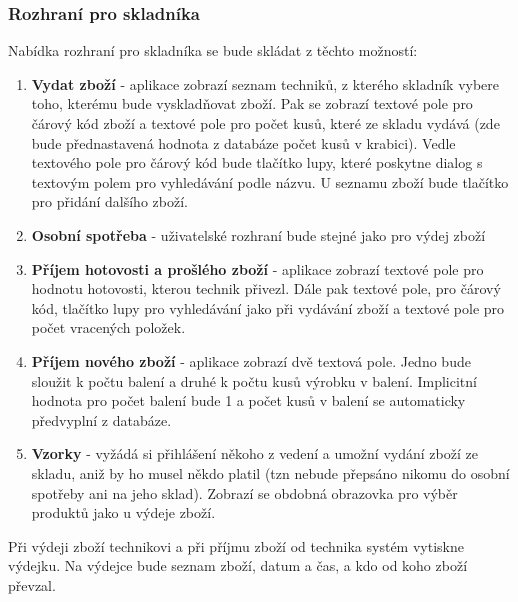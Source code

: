 \documentclass[a4paper,10pt]{article}
\begin{document}
\subsubsection{Rozhraní pro skladníka}
Nabídka rozhraní pro skladníka se bude skládat z těchto možností:
\begin{enumerate}
	\item \textbf{Vydat zboží} - aplikace zobrazí seznam techniků, z kterého skladník vybere toho, kterému bude vyskladňovat zboží. Pak se zobrazí textové pole pro čárový kód zboží a textové pole pro počet kusů, které ze skladu vydává (zde bude přednastavená hodnota z databáze počet kusů v krabici). Vedle textového pole pro čárový kód bude tlačítko lupy, které poskytne dialog s textovým polem pro vyhledávání podle názvu. U seznamu zboží bude tlačítko pro přidání dalšího zboží.
	\item \textbf{Osobní spotřeba} - uživatelské rozhraní bude stejné jako pro výdej zboží
	\item \textbf{Příjem hotovosti a prošlého zboží} - aplikace zobrazí textové pole pro hodnotu hotovosti, kterou technik přivezl. Dále pak textové pole, pro čárový kód, tlačítko lupy pro vyhledávání jako při vydávání zboží a textové pole pro počet vracených položek.
	\item \textbf{Příjem nového zboží} - aplikace zobrazí dvě textová pole. Jedno bude sloužit k počtu balení a druhé k počtu kusů výrobku v balení. Implicitní hodnota pro počet balení bude 1 a počet kusů v balení se automaticky předvyplní z databáze.
	\item \textbf{Vzorky} - vyžádá si přihlášení někoho z vedení a umožní vydání zboží ze skladu, aniž by ho musel někdo platil (tzn nebude přepsáno nikomu do osobní spotřeby ani na jeho sklad). Zobrazí se obdobná obrazovka pro výběr produktů jako u výdeje zboží.
\end{enumerate}

Při výdeji zboží technikovi a při příjmu zboží od technika systém vytiskne výdejku. Na výdejce bude seznam zboží, datum a čas, a kdo od koho zboží převzal.
\end{document}
